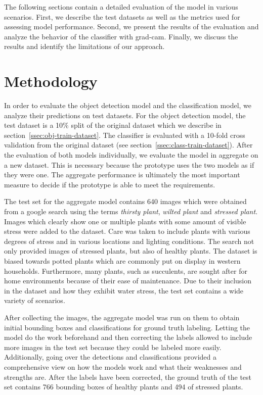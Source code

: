 \documentclass[draft,final]{vutinfth} %
\begin{document}
The following sections contain a detailed evaluation of the model in
various scenarios. First, we describe the test datasets as well as the
metrics used for assessing model performance. Second, we present the
results of the evaluation and analyze the behavior of the classifier
with \gls{grad-cam}. Finally, we discuss the results and identify the
limitations of our approach.

\section{Methodology}
\label{sec:methodology}

In order to evaluate the object detection model and the classification
model, we analyze their predictions on test datasets. For the object
detection model, the test dataset is a 10\% split of the original
dataset which we describe in section~\ref{ssec:obj-train-dataset}. The
classifier is evaluated with a \num{10}-fold cross validation from the
original dataset (see section~\ref{ssec:class-train-dataset}). After
the evaluation of both models individually, we evaluate the model in
aggregate on a new dataset. This is necessary because the prototype
uses the two models as if they were one. The aggregate performance is
ultimately the most important measure to decide if the prototype is
able to meet the requirements.

The test set for the aggregate model contains \num{640} images which
were obtained from a google search using the terms \emph{thirsty
plant}, \emph{wilted plant} and \emph{stressed plant}. Images which
clearly show one or multiple plants with some amount of visible stress
were added to the dataset. Care was taken to include plants with
various degrees of stress and in various locations and lighting
conditions. The search not only provided images of stressed plants,
but also of healthy plants. The dataset is biased towards potted
plants which are commonly put on display in western
households. Furthermore, many plants, such as succulents, are sought
after for home environments because of their ease of maintenance. Due
to their inclusion in the dataset and how they exhibit water stress,
the test set contains a wide variety of scenarios.

After collecting the images, the aggregate model was run on them to
obtain initial bounding boxes and classifications for ground truth
labeling. Letting the model do the work beforehand and then correcting
the labels allowed to include more images in the test set because they
could be labeled more easily. Additionally, going over the detections
and classifications provided a comprehensive view on how the models
work and what their weaknesses and strengths are. After the labels
have been corrected, the ground truth of the test set contains
\num{766} bounding boxes of healthy plants and \num{494} of stressed
plants.
\end{document}
